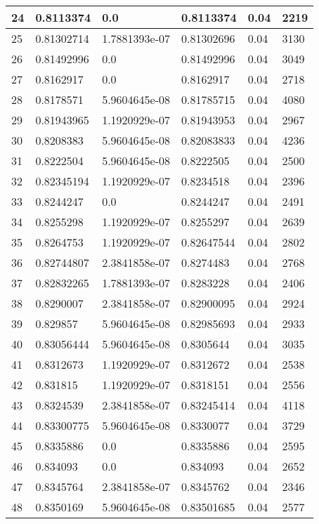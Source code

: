 \begin{longtable}{|l|l|l|l|l|l|}
24 & 0.8113374 & 0.0 & 0.8113374 & 0.04 & 2219 \\ \hline 
25 & 0.81302714 & 1.7881393e-07 & 0.81302696 & 0.04 & 3130 \\ \hline 
26 & 0.81492996 & 0.0 & 0.81492996 & 0.04 & 3049 \\ \hline 
27 & 0.8162917 & 0.0 & 0.8162917 & 0.04 & 2718 \\ \hline 
28 & 0.8178571 & 5.9604645e-08 & 0.81785715 & 0.04 & 4080 \\ \hline 
29 & 0.81943965 & 1.1920929e-07 & 0.81943953 & 0.04 & 2967 \\ \hline 
30 & 0.8208383 & 5.9604645e-08 & 0.82083833 & 0.04 & 4236 \\ \hline 
31 & 0.8222504 & 5.9604645e-08 & 0.8222505 & 0.04 & 2500 \\ \hline 
32 & 0.82345194 & 1.1920929e-07 & 0.8234518 & 0.04 & 2396 \\ \hline 
33 & 0.8244247 & 0.0 & 0.8244247 & 0.04 & 2491 \\ \hline 
34 & 0.8255298 & 1.1920929e-07 & 0.8255297 & 0.04 & 2639 \\ \hline 
35 & 0.8264753 & 1.1920929e-07 & 0.82647544 & 0.04 & 2802 \\ \hline 
36 & 0.82744807 & 2.3841858e-07 & 0.8274483 & 0.04 & 2768 \\ \hline 
37 & 0.82832265 & 1.7881393e-07 & 0.8283228 & 0.04 & 2406 \\ \hline 
38 & 0.8290007 & 2.3841858e-07 & 0.82900095 & 0.04 & 2924 \\ \hline 
39 & 0.829857 & 5.9604645e-08 & 0.82985693 & 0.04 & 2933 \\ \hline 
40 & 0.83056444 & 5.9604645e-08 & 0.8305644 & 0.04 & 3035 \\ \hline 
41 & 0.8312673 & 1.1920929e-07 & 0.8312672 & 0.04 & 2538 \\ \hline 
42 & 0.831815 & 1.1920929e-07 & 0.8318151 & 0.04 & 2556 \\ \hline 
43 & 0.8324539 & 2.3841858e-07 & 0.83245414 & 0.04 & 4118 \\ \hline 
44 & 0.83300775 & 5.9604645e-08 & 0.8330077 & 0.04 & 3729 \\ \hline 
45 & 0.8335886 & 0.0 & 0.8335886 & 0.04 & 2595 \\ \hline 
46 & 0.834093 & 0.0 & 0.834093 & 0.04 & 2652 \\ \hline 
47 & 0.8345764 & 2.3841858e-07 & 0.8345762 & 0.04 & 2346 \\ \hline 
48 & 0.8350169 & 5.9604645e-08 & 0.83501685 & 0.04 & 2577 \\ \hline 

\end{longtable}
